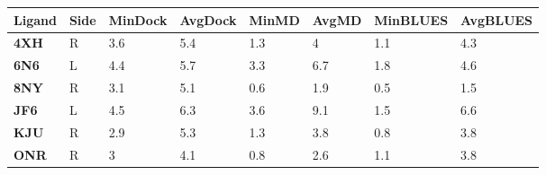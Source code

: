 \begin{table}[]
\begin{tabular}{|l|l|l|l|l|l|l|l|}
\hline
\rowcolor[HTML]{9B9B9B} 
{\color[HTML]{333333} \textbf{Ligand}} & {\color[HTML]{333333} \textbf{Side}} & {\color[HTML]{333333} \textbf{MinDock}} & {\color[HTML]{333333} \textbf{AvgDock}} & {\color[HTML]{333333} \textbf{MinMD}} & {\color[HTML]{333333} \textbf{AvgMD}} & {\color[HTML]{333333} \textbf{MinBLUES}} & {\color[HTML]{333333} \textbf{AvgBLUES}} \\ \hline
\textbf{4XH}                           & R                                    & 3.6                                     & 5.4                                     & 1.3                                   & 4                                     & 1.1                                      & 4.3                                      \\ \hline
\textbf{6N6}                           & L                                    & 4.4                                     & 5.7                                     & 3.3                                   & 6.7                                   & 1.8                                      & 4.6                                      \\ \hline
\textbf{8NY}                           & R                                    & 3.1                                     & 5.1                                     & 0.6                                   & 1.9                                   & 0.5                                      & 1.5                                      \\ \hline
\textbf{JF6}                           & L                                    & 4.5                                     & 6.3                                     & 3.6                                   & 9.1                                   & 1.5                                      & 6.6                                      \\ \hline
\textbf{KJU}                           & R                                    & 2.9                                     & 5.3                                     & 1.3                                   & 3.8                                   & 0.8                                      & 3.8                                      \\ \hline
\textbf{ONR}                           & R                                    & 3                                       & 4.1                                     & 0.8                                   & 2.6                                   & 1.1                                      & 3.8                                      \\ \hline

\end{tabular}
\end{table}

